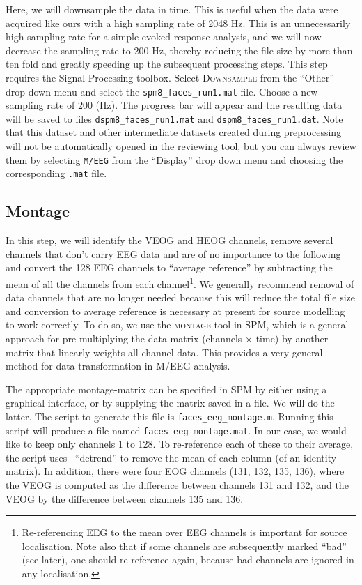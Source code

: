 Here, we will downsample the data in time. This is useful when the data were acquired like ours with a high sampling rate of 2048 Hz. This is an unnecessarily high sampling rate for a simple evoked response analysis, and we will now decrease the sampling rate to 200 Hz, thereby reducing the file size by more than ten fold and greatly speeding up the subsequent processing steps. This step requires the Signal Processing toolbox. Select \textsc{Downsample} from the ``Other'' drop-down menu and select the \texttt{spm8\_faces\_run1.mat} file. Choose a new sampling rate of 200 (Hz). The progress bar will appear and the resulting data will be saved to files \texttt{dspm8\_faces\_run1.mat} and \texttt{dspm8\_faces\_run1.dat}. Note that this dataset and other intermediate datasets created during preprocessing will not be automatically opened in the reviewing tool, but you can always review them by selecting \texttt{M/EEG} from the ``Display'' drop down menu and choosing the corresponding \texttt{.mat} file.

\subsection{Montage}

In this step, we will identify the VEOG and HEOG channels, remove several channels that don't carry EEG data and are of no importance to the following and convert the 128 EEG channels to ``average reference'' by subtracting the mean of all the channels from each channel\footnote{Re-referencing EEG to the mean over EEG channels is important for source localisation. Note also that if some channels are subsequently marked ``bad'' (see later), one should re-reference again, because bad channels are ignored in any localisation.}. We generally recommend removal of data channels that are no longer needed because this will reduce the total file size and conversion to average reference is necessary at present for source modelling to work correctly. To do so, we use the \textsc{montage} tool in SPM, which is a general approach for pre-multiplying the data matrix (channels $\times$ time) by another matrix that linearly weights all channel data. This provides a very general method for data transformation in M/EEG analysis.

The appropriate montage-matrix can be specified in SPM by either using a graphical interface, or by supplying the matrix saved in a file. We will do the latter. The script to generate this file is \texttt{faces\_eeg\_montage.m}. Running this script will produce a file named \texttt{faces\_eeg\_montage.mat}. In our case, we would like to keep only channels 1 to 128. To re-reference each of these to their average, the script uses \matlab\ ``detrend'' to remove the mean of each column (of an identity matrix). In addition, there were four EOG channels (131, 132, 135, 136), where the VEOG is computed as the difference between channels 131 and 132, and the VEOG by the difference between channels 135 and 136. 

